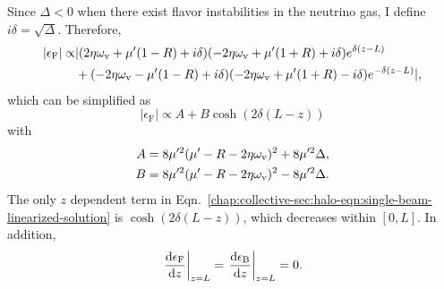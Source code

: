 Since $\Delta < 0$ when there exist flavor instabilities in the neutrino gas, I define $i\delta = \sqrt{\Delta}$. Therefore,
\begin{align}
   \left\vert \epsilon_{\mathrm F} \right\vert \propto & \lvert (2\eta\omega_\vv + \mu'(1-R) +i \delta ) ( -2\eta\omega_\vv + \mu'(1+R) + i \delta ) e^{\delta(z-L)} \nonumber\\
   &+ ( -2\eta\omega_\vv - \mu'(1-R) +i \delta ) ( -2\eta\omega_\vv + \mu'(1+R) - i \delta ) e^{-\delta(z-L)} \rvert,
   \label{chap:collective-sec:halo-eqn:linearized-eom-solution}
\end{align}
which can be simplified as
\begin{equation}
   \left\vert \epsilon_{\mathrm F} \right\vert \propto A + B \cosh( 2\delta(L-z) )
   \label{chap:collective-sec:halo-eqn:single-beam-linearized-solution}
\end{equation}
with
\begin{align}
    A &= 8 \mu'^2 (\mu' - R - 2 \eta\omega_\mathrm v )^2 + 8 \mu'^2 \Delta, \\
    B &= 8 \mu'^2 (\mu' - R - 2 \eta\omega_\mathrm v )^2 - 8 \mu'^2 \Delta .
\end{align}
The only $z$ dependent term in Eqn.~\eqref{chap:collective-sec:halo-eqn:single-beam-linearized-solution} is $\cosh( 2\delta(L-z) )$, which decreases within $[0,L]$. In addition,
\begin{equation}
    \left. \frac{\mathrm d \epsilon_\mathrm F}{\mathrm d z} \right \vert_{z=L} = \left. \frac{\mathrm d \epsilon_\mathrm B}{\mathrm d z} \right \vert_{z=L} = 0.
\end{equation}



